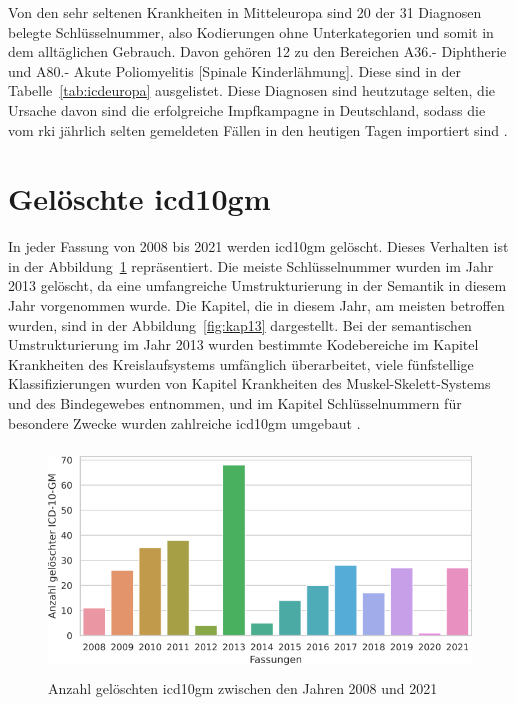 Von den sehr seltenen Krankheiten in Mitteleuropa sind \textsf{20} der \textsf{31} Diagnosen belegte Schlüsselnummer, also Kodierungen ohne Unterkategorien und somit in dem alltäglichen  Gebrauch. Davon gehören \textsf{12} zu den Bereichen \textsf{A36.-} \textsf{Diphtherie} und \textsf{A80.-} \textsf{Akute Poliomyelitis [Spinale Kinderlähmung]}. Diese sind in der Tabelle~\ref{tab:icdeuropa} ausgelistet. Diese Diagnosen sind heutzutage selten, die Ursache davon sind die erfolgreiche Impfkampagne in Deutschland, sodass die vom \ac{rki} jährlich selten gemeldeten Fällen in den heutigen Tagen importiert sind \cite{dippol1}.

\section{Gelöschte \acs{icd10gm}} \label{sec:deletedicd}

In jeder Fassung von 2008 bis 2021 werden \ac{icd10gm} gelöscht. Dieses Verhalten ist in der Abbildung~\ref{fig:newdeleteoldicdyear} repräsentiert. Die meiste Schlüsselnummer wurden im Jahr 2013 gelöscht, da eine umfangreiche Umstrukturierung in der Semantik in diesem Jahr vorgenommen wurde. Die Kapitel, die in diesem Jahr, am meisten betroffen wurden, sind in der Abbildung~\ref{fig:kap13} dargestellt. Bei der semantischen Umstrukturierung im Jahr 2013 wurden bestimmte Kodebereiche im Kapitel \textsf{Krankheiten des Kreislaufsystems} umfänglich überarbeitet, viele fünfstellige Klassifizierungen wurden von Kapitel \textsf{Krankheiten des Muskel-Skelett-Systems und des Bindegewebes} entnommen, und im Kapitel \textsf{Schlüsselnummern für besondere Zwecke} wurden zahlreiche \ac{icd10gm} umgebaut \cite{dele13}.

\begin{figure}[ht]
	\centering
	\includegraphics[height=6cm]{figures/neuVersionDelete}
	\caption[Gelöschte \acs{icd10gm} pro Jahr]{Anzahl gelöschten \acs{icd10gm} zwischen den Jahren 2008 und 2021}
	\label{fig:newdeleteoldicdyear}
\end{figure} 

